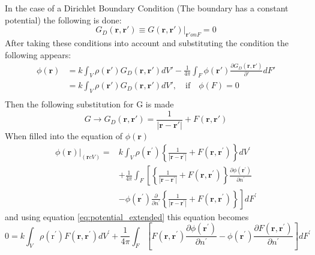 \noindent In the case of a Dirichlet Boundary Condition (The boundary has a constant potential) the following is done:
\begin{equation}
    G_{D}(\textbf{r},\textbf{r}') \equiv G(\textbf{r},\textbf{r}')\bigg\rvert_{\textbf{r}' on F}  = 0
\end{equation}
After taking these conditions into account and substituting the condition the following appears:
\begin{equation}
    \begin{aligned}
        \phi(\textbf{r}) &= k \int_V \rho(\textbf{r}')G_D (\textbf{r},\textbf{r}')dV' - \frac{1}{4\pi} \int_F \phi(\textbf{r}')\frac{\partial G_D (\textbf{r},\textbf{r}') }{\partial'} dF'\\
                         &= k \int_V \rho(\textbf{r}')G_D (\textbf{r},\textbf{r}')dV', \quad \text{if} \quad \phi(F) =0 \\
    \end{aligned}
\end{equation}
Then the following substitution for G is made
\begin{equation}
    G \rightarrow G_{D}(\textbf{r},\textbf{r}') = \frac{1}{|\textbf{r}-\textbf{r}'|} +F(\textbf{r},\textbf{r}')
\end{equation}
When filled into the equation of $\phi(\textbf{r})$
\begin{equation}
    \begin{aligned}
    \left.\phi(\mathbf{r})\right|_{(\mathbf{r} c V)}=& k \int_{V} \rho\left(\mathbf{r}^{\prime}\right)\left\{\frac{1}{\left|\mathbf{r}-\mathbf{r}^{\prime}\right|}+F\left(\mathbf{r}, \mathbf{r}^{\prime}\right)\right\} d V^{\prime} \\
    &+\frac{1}{4 \pi} \int_{F}\left[\left\{\frac{1}{\left|\mathbf{r}-\mathbf{r}^{\prime}\right|}+F\left(\mathbf{r}, \mathbf{r}^{\prime}\right)\right\} \frac{\partial \phi\left(\mathbf{r}^{\prime}\right)}{\partial n^{\prime}}\right.\\
    &\left.-\phi\left(\mathbf{r}^{\prime}\right) \frac{\partial}{\partial n^{\prime}}\left\{\frac{1}{\left|\mathbf{r}-\mathbf{r}^{\prime}\right|}+F\left(\mathbf{r}, \mathbf{r}^{\prime}\right)\right\}\right] d F^{\prime}
    \end{aligned}
\end{equation}
and using equation \ref{eq:potential_extended} this equation becomes
\begin{equation}
    0=k \int_{V} \rho\left(\mathrm{r}^{\prime}\right) F\left(\mathbf{r}, \mathbf{r}^{\prime}\right) d V^{\prime}+\frac{1}{4 \pi} \int_{F}\left[F\left(\mathbf{r}, \mathbf{r}^{\prime}\right) \frac{\partial \phi\left(\mathbf{r}^{\prime}\right)}{\partial n^{\prime}}-\phi\left(\mathbf{r}^{\prime}\right) \frac{\partial F\left(\mathbf{r}, \mathbf{r}^{\prime}\right)}{\partial n^{\prime}}\right] d F^{\prime}
\end{equation}
